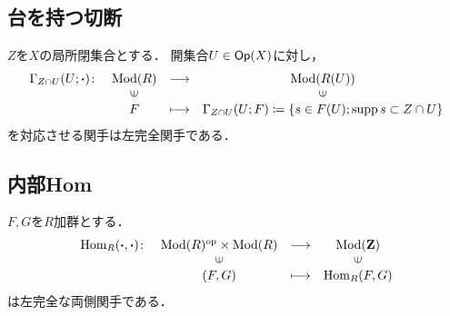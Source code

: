 \subsection{台を持つ切断}

\begin{PRP}[台を持つ切断は左完全]
    \(Z\)を\(X\)の局所閉集合とする．
    開集合$U\in\mathop{\textsf{Op}}\nolimits(X)$に対し，
    \[
        \begin{array}{rccc}
            \Gamma_{Z\cap U}(U;{\boldsymbol{\cdot}})\colon&\Mod(R)&\longrightarrow&\Mod(R(U))\\
            &\rotatebox{90}{$\in$}&&\rotatebox{90}{$\in$}\\
            &F&\longmapsto&\Gamma_{Z\cap U}(U;F)\coloneqq\left\{s\in F(U); \supp{s}\subset Z\cap U\right\}
        \end{array}
    \]
    を対応させる関手は左完全関手である．
\end{PRP}



























\subsection{内部Hom}
\begin{PRP}[Homは左完全]
    $F,G$を$R$加群とする．
    \begin{equation*}
        \begin{array}{rccc}
            \Hom_R({\boldsymbol{\cdot}},{\boldsymbol{\cdot}})\colon
            &\Mod(R)^{\op}\times\Mod(R)
            &\longrightarrow&\Mod(\zz)\\
            &\rotatebox{90}{$\in$}&&\rotatebox{90}{$\in$}\\
            & (F,G)&\longmapsto&\Hom_R(F,G)
        \end{array}
    \end{equation*}
    は左完全な両側関手である．
\end{PRP}


